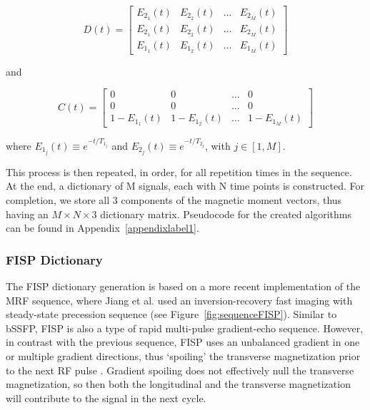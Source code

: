\begin{equation}
    D(t)  = 
    \begin{bmatrix}
        E_{2_1}(t)  & E_{2_2}(t)  & \dots & E_{2_M}(t)  \\
        E_{2_1}(t)  & E_{2_2}(t)  & \dots & E_{2_M}(t)  \\
        E_{1_1}(t)  & E_{1_2}(t)  & \dots & E_{1_M}(t)  
    \end{bmatrix}
\end{equation}

and

\begin{equation}
    C(t)  = 
    \begin{bmatrix}
        0 & 0 & \dots & 0 \\
        0 & 0 & \dots & 0 \\
        1 - E_{1_1}(t)  & 1- E_{1_2}(t)  & \dots & 1- E_{1_M}(t)  
    \end{bmatrix} 
\end{equation}

where $E_{1_j}(t) \equiv e^{-t/T_{1_j}}$ and $E_{2_j}(t) \equiv e^{-t/T_{2_j}}$, with $j \in [1, M]$.

\hfill 

This process is then repeated, in order, for all repetition times in the sequence.
At the end, a dictionary of M signals, each with N time points is constructed.
For completion, we store all 3 components of the magnetic moment vectors, thus having an $M \times N \times 3$ dictionary matrix.
Pseudocode for the created algorithms can be found in Appendix~\ref{appendixlabel1}.

\hfill

\subsubsection{FISP Dictionary} 

The FISP dictionary generation is based on a more recent implementation of the MRF sequence, where Jiang et al. \cite{Jiang2015} used an inversion-recovery fast imaging with steady-state precession sequence (see Figure~\ref{fig:sequenceFISP}).
Similar to bSSFP, FISP is also a type of rapid multi-pulse gradient-echo sequence.
However, in contrast with the previous sequence, FISP uses an unbalanced gradient in one or multiple gradient directions, thus `spoiling' the transverse magnetization prior to the next RF pulse \cite{Hargreaves2012}.
Gradient spoiling does not effectively null the transverse magnetization, so then both the longitudinal and the transverse magnetization will contribute to the signal in the next cycle.

